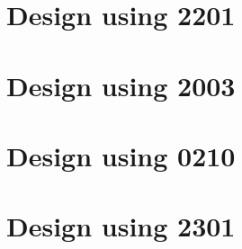 \section{Design using 2201}


 \begin{center}




 \end{center}



\section{Design using 2003}


 \begin{center}




 \end{center}



\section{Design using 0210}


 \begin{center}




 \end{center}



\section{Design using 2301}

